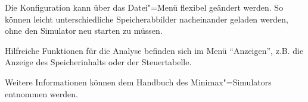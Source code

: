 Die Konfiguration kann über das Datei"=Menü flexibel geändert werden. So können leicht unterschiedliche Speicherabbilder nacheinander geladen werden, ohne den Simulator neu starten zu müssen.

Hilfreiche Funktionen für die Analyse befinden sich im Menü "`Anzeigen"', z.B. die Anzeige des Speicherinhalts oder der Steuertabelle.

Weitere Informationen können dem Handbuch des Minimax"=Simulators \cite{minimax-handbuch} entnommen werden.